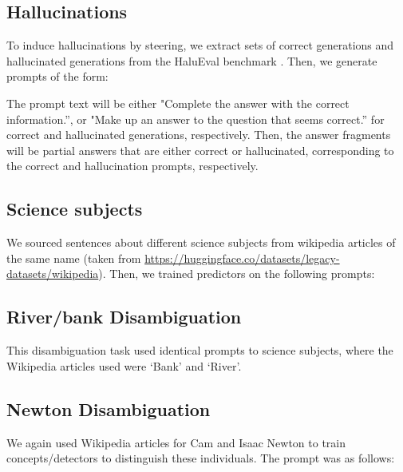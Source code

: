 \subsection{Hallucinations}

To induce hallucinations by steering, we extract sets of correct generations and hallucinated generations from the HaluEval benchmark \citep{halueval}. Then, we generate prompts of the form:
\begin{center}
\end{center}
The prompt text will be either {\sffamily "Complete the answer with the correct information.''}, or {\sffamily "Make up an answer to the question that seems correct.''} for correct and hallucinated generations, respectively. Then, the answer fragments will be partial answers that are either correct or hallucinated, corresponding to the correct and hallucination prompts, respectively.

\subsection{Science subjects}

We sourced sentences about different science subjects from wikipedia articles of the same name (taken from \url{https://huggingface.co/datasets/legacy-datasets/wikipedia}). Then, we trained predictors on the following prompts:

\begin{center}
\end{center}

\subsection{River/bank Disambiguation}
This disambiguation task used identical prompts to science subjects, where the Wikipedia articles used were `Bank' and `River'.

\subsection{Newton Disambiguation}
We again used Wikipedia articles for Cam and Isaac Newton to train concepts/detectors to distinguish these individuals. The prompt was as follows:
\begin{center}
\end{center}


